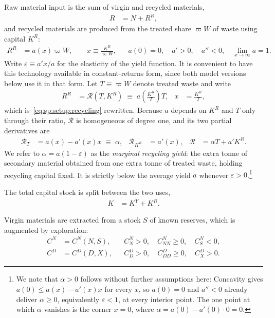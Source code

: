  Raw material input is the sum of virgin and recycled materials,
\begin{align}
R &= N + R^R,
\label{eq:sp:setup:materials}
\end{align}
and recycled materials are produced from the treated share $\varpi W$ of waste using capital $K^R$:
\begin{align}
R^R &= a\!\left(x\right)\varpi W,
\qquad
x\equiv\frac{K^R}{\varpi W},
&&
a(0)=0,\quad a'>0,\quad a''<0,\quad
\lim_{x\to\infty}a=1.
\label{eq:sp:setup:recycling}
\end{align}
Write $\varepsilon\equiv a'x/a$ for the elasticity of the yield function. It is convenient to have this technology available in constant-returns form, since both model
versions below use it in that form. Let $T\equiv\varpi W$ denote treated waste and write
\begin{align}
R^R &= \mathcal R\left(T,K^R\right)\;\equiv\;a\!\left(\frac{K^R}{T}\right)T,
&
x&=\frac{K^R}{T},
\label{eq:sp:setup:recycling-crs}
\end{align}
which is~\eqref{eq:sp:setup:recycling} rewritten. Because $a$ depends on $K^R$ and $T$ only through
their ratio, $\mathcal R$ is homogeneous of degree one, and its two partial derivatives are
\begin{align}
\mathcal R_T &= a\left(x\right)-a'\!\left(x\right)x \;\equiv\;\alpha,
&
\mathcal R_{K^R} &= a'\!\left(x\right),
&
\mathcal R &= \alpha T+a'K^R .
\label{eq:sp:setup:recycling-derivatives}
\end{align}
We refer to $\alpha=a\left(1-\varepsilon\right)$ as the \emph{marginal recycling yield}: the extra
tonne of secondary material obtained from one extra tonne of treated waste, holding recycling
capital fixed. It is strictly below the average yield $a$ whenever $\varepsilon>0$.\footnote{We note that $\alpha>0$ follows without further assumptions here: Concavity gives
$a\left(0\right)\le a\left(x\right)-a'\left(x\right)x$ for every $x$, so $a(0)=0$ and $a''<0$
already deliver $\alpha\geq 0$, equivalently $\varepsilon<1$, at every interior point. The one point at which $\alpha$
vanishes is the corner $x=0$, where $\alpha=a(0)-a'\!\left(0\right)\cdot 0=0$.}

 The total capital stock is split between the two uses,
\begin{align}
K &= K^Y + K^R.
\label{eq:sp:setup:capital-allocation}
\end{align}

 Virgin materials are extracted from a stock $S$ of known reserves, which is augmented by exploration:
\begin{align}
C^N &= C^N(N,S),
&&
C^N_N>0,\quad C^N_{NN}\ge 0,\quad C^N_S<0,
\label{eq:sp:setup:extraction-cost}
\\
C^D &= C^D(D,X),
&&
C^D_D>0,\quad C^D_{DD}\ge 0,\quad C^D_X>0.
\label{eq:sp:setup:discovery-cost}
\end{align}

